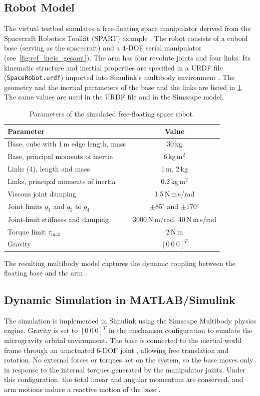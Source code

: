 \documentclass{ieeeaccess}
\begin{document}
\subsection{Robot Model} The virtual testbed simulates a free-floating space manipulator derived from the
Spacecraft Robotics Toolkit (SPART) example \cite{b9}. The robot consists of a cuboid base (serving as
the spacecraft) and a 4-DOF serial manipulator (see~\cref{fig:ref_kreis_gesamt}). The arm has four
revolute joints and four links. Its kinematic structure and inertial properties are specified in a URDF
file (\texttt{SpaceRobot.urdf}) imported into Simulink's multibody environment \cite{b25,b26,b27}.
The geometry and the inertial parameters of the base and the links are listed in
\cref{tab:robot_params}. The same values are used in the URDF file and in the Simscape model.

\begin{table}[!t]
\centering
\caption{Parameters of the simulated free-floating space robot.}
\label{tab:robot_params}
\begin{tabular}{lc}
\toprule
\textbf{Parameter} & \textbf{Value} \\
\midrule
Base, cube with 1\,m edge length, mass & 30\,kg \\
Base, principal moments of inertia & 6\,kg\,m$^2$ \\
Links (4), length and mass & 1\,m, 2\,kg \\
Links, principal moments of inertia & 0.2\,kg\,m$^2$ \\
Viscous joint damping & 1.5\,N\,m\,s/rad \\
Joint limits $q_1$ and $q_2$ to $q_4$ & $\pm 85^\circ$ and $\pm 170^\circ$ \\
Joint-limit stiffness and damping & 3000\,N\,m/rad, 40\,N\,m\,s/rad \\
Torque limit $\tau_{\max}$ & 2\,N\,m \\
Gravity & $[0~0~0]^T$ \\
\bottomrule
\end{tabular}
\end{table}
 The resulting multibody model captures the dynamic coupling between the floating base
and the arm \cite{b6}.

\subsection{Dynamic Simulation in MATLAB/Simulink} The simulation is implemented in Simulink using the
Simscape Multibody physics engine. Gravity is set to $[0~0~0]^T$ in the mechanism
configuration \cite{b28} to emulate the microgravity orbital environment. The base is connected to the
inertial world frame through an unactuated 6-DOF joint \cite{b3}, allowing free translation and
rotation. No external forces or torques act on the system, so the base moves only in response to the
internal torques generated by the manipulator joints. Under this configuration, the total linear and
angular momentum are conserved, and arm motions induce a reactive motion of the base
\cite{b6,kaigom2011optimal}.
\end{document}
